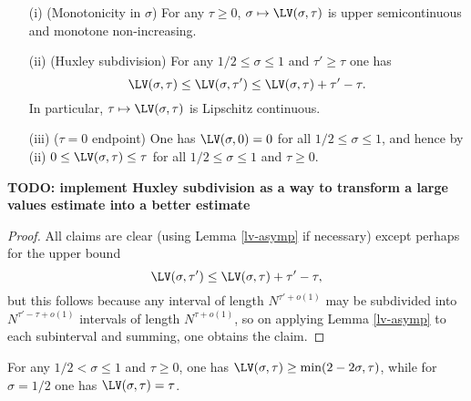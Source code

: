 \begin{lemma}\label{lv-basic}  
    \begin{itemize}
        \item[(i)] (Monotonicity in $\sigma$) For any $\tau \geq 0$, $\sigma \mapsto \LV(\sigma,\tau)$ is upper semicontinuous and monotone non-increasing.
        \item[(ii)] (Huxley subdivision) For any $1/2 \leq \sigma \leq 1$ and $\tau' \geq \tau$ one has
$$ \LV(\sigma,\tau) \leq \LV(\sigma,\tau') \leq \LV(\sigma,\tau) + \tau'-\tau.$$
In particular, $\tau \mapsto \LV(\sigma,\tau)$ is Lipschitz continuous.
        \item[(iii)]  ($\tau=0$ endpoint) One has $\LV(\sigma,0)=0$ for all $1/2 \leq \sigma \leq 1$, and hence by (ii) $0 \leq \LV(\sigma,\tau) \leq \tau$ for all $1/2 \leq \sigma \leq 1$ and $\tau \geq 0$.
    \end{itemize}
\end{lemma}

{\bf TODO: implement Huxley subdivision as a way to transform a large values estimate into a better estimate}

\begin{proof}
All claims are clear (using Lemma \ref{lv-asymp} if necessary) except perhaps for the upper bound
$$ \LV(\sigma,\tau') \leq \LV(\sigma,\tau) + \tau'-\tau,$$
but this follows because any interval of length $N^{\tau'+o(1)}$ may be subdivided into $N^{\tau'-\tau+o(1)}$ intervals of length $N^{\tau+o(1)}$, so on applying Lemma \ref{lv-asymp} to each subinterval and summing, one obtains the claim.
\end{proof}

\begin{lemma}\label{lv-lower}  For any $1/2 < \sigma \leq 1$ and $\tau \geq 0$, one has $\LV(\sigma, \tau) \geq \min(2 - 2 \sigma,\tau)$, while for $\sigma=1/2$ one has $\LV(\sigma,\tau) = \tau$.
\end{lemma}


